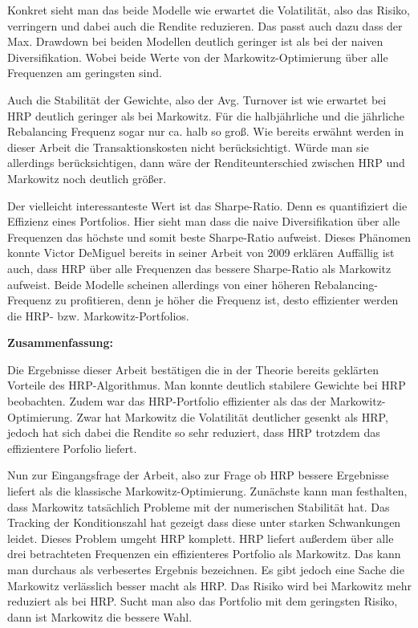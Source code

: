 \documentclass[parskip=half]{scrartcl}
\begin{document}
	Konkret sieht man das beide Modelle wie erwartet die Volatilität, also das Risiko, verringern und dabei auch die Rendite reduzieren. Das passt auch dazu dass der Max. Drawdown bei beiden Modellen deutlich geringer ist als bei der naiven Diversifikation. Wobei beide Werte von der Markowitz-Optimierung über alle Frequenzen am geringsten sind.
	
	Auch die Stabilität der Gewichte, also der Avg. Turnover ist wie erwartet bei HRP deutlich geringer als bei Markowitz. Für die halbjährliche und die jährliche Rebalancing Frequenz sogar nur ca. halb so groß. Wie bereits erwähnt werden in dieser Arbeit die Transaktionskosten nicht berücksichtigt. Würde man sie allerdings berücksichtigen, dann wäre der Renditeunterschied zwischen HRP und Markowitz noch deutlich größer.
	
	
	Der vielleicht interessanteste Wert ist das Sharpe-Ratio. Denn es quantifiziert die Effizienz eines Portfolios. Hier sieht man dass die naive Diversifikation über alle Frequenzen das höchste und somit beste Sharpe-Ratio aufweist. Dieses Phänomen konnte Victor DeMiguel bereits in seiner Arbeit von 2009 erklären \parencite[1947]{Puzzle} Auffällig ist auch, dass HRP über alle Frequenzen das bessere Sharpe-Ratio als Markowitz aufweist. Beide Modelle scheinen allerdings von einer höheren Rebalancing-Frequenz zu profitieren, denn je höher die Frequenz ist, desto effizienter werden die HRP- bzw. Markowitz-Portfolios.
	
	
	\textbf{Zusammenfassung:} 
	
	Die Ergebnisse dieser Arbeit bestätigen die in der Theorie bereits geklärten Vorteile des HRP-Algorithmus. Man konnte deutlich stabilere Gewichte bei HRP beobachten. Zudem war das HRP-Portfolio effizienter als das der Markowitz-Optimierung. Zwar hat Markowitz die Volatilität deutlicher gesenkt als HRP, jedoch hat sich dabei die Rendite so sehr reduziert, dass HRP trotzdem das effizientere Porfolio liefert.
	
	Nun zur Eingangsfrage der Arbeit, also zur Frage ob HRP bessere Ergebnisse liefert als die klassische Markowitz-Optimierung. Zunächste kann man festhalten, dass Markowitz tatsächlich Probleme mit der numerischen Stabilität hat. Das Tracking der Konditionszahl hat gezeigt dass diese unter starken Schwankungen leidet. Dieses Problem umgeht HRP komplett. HRP liefert außerdem über alle drei betrachteten Frequenzen ein effizienteres Portfolio als Markowitz. Das kann man durchaus als verbesertes Ergebnis bezeichnen. Es gibt jedoch eine Sache die Markowitz verlässlich besser macht als HRP. Das Risiko wird bei Markowitz mehr reduziert als bei HRP. Sucht man also das Portfolio mit dem geringsten Risiko, dann ist Markowitz die bessere Wahl.
	
\end{document}
